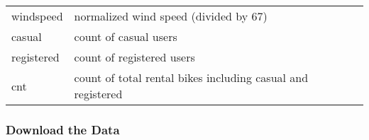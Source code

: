 \documentclass[11pt]{article}
\begin{document}
\begin{longtable}[]{@{}ll@{}}
\begin{minipage}[t]{0.17\columnwidth}\raggedright\strut
windspeed\strut
\end{minipage} & \begin{minipage}[t]{0.77\columnwidth}\raggedright\strut
normalized wind speed (divided by 67)\strut
\end{minipage}\tabularnewline
\begin{minipage}[t]{0.17\columnwidth}\raggedright\strut
casual\strut
\end{minipage} & \begin{minipage}[t]{0.77\columnwidth}\raggedright\strut
count of casual users\strut
\end{minipage}\tabularnewline
\begin{minipage}[t]{0.17\columnwidth}\raggedright\strut
registered\strut
\end{minipage} & \begin{minipage}[t]{0.77\columnwidth}\raggedright\strut
count of registered users\strut
\end{minipage}\tabularnewline
\begin{minipage}[t]{0.17\columnwidth}\raggedright\strut
cnt\strut
\end{minipage} & \begin{minipage}[t]{0.77\columnwidth}\raggedright\strut
count of total rental bikes including casual and registered\strut
\end{minipage}\tabularnewline
\bottomrule
\end{longtable}

    \subsubsection{Download the Data}\label{download-the-data}
\end{document}
